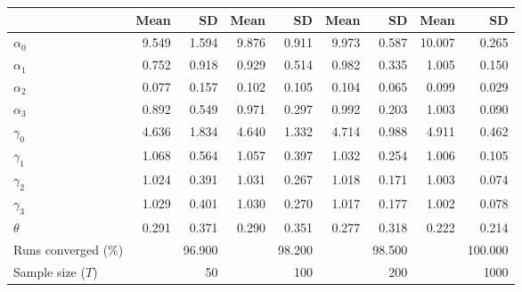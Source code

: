
\begin{tabular}[t]{lrrrrrrrr}
\toprule
  & Mean & SD & Mean  & SD  & Mean   & SD   & Mean    & SD   \\
\midrule
$\alpha_{0}$ & 9.549 & 1.594 & 9.876 & 0.911 & 9.973 & 0.587 & 10.007 & 0.265\\
$\alpha_{1}$ & 0.752 & 0.918 & 0.929 & 0.514 & 0.982 & 0.335 & 1.005 & 0.150\\
$\alpha_{2}$ & 0.077 & 0.157 & 0.102 & 0.105 & 0.104 & 0.065 & 0.099 & 0.029\\
$\alpha_{3}$ & 0.892 & 0.549 & 0.971 & 0.297 & 0.992 & 0.203 & 1.003 & 0.090\\
$\gamma_{0}$ & 4.636 & 1.834 & 4.640 & 1.332 & 4.714 & 0.988 & 4.911 & 0.462\\
$\gamma_{1}$ & 1.068 & 0.564 & 1.057 & 0.397 & 1.032 & 0.254 & 1.006 & 0.105\\
$\gamma_{2}$ & 1.024 & 0.391 & 1.031 & 0.267 & 1.018 & 0.171 & 1.003 & 0.074\\
$\gamma_{3}$ & 1.029 & 0.401 & 1.030 & 0.270 & 1.017 & 0.177 & 1.002 & 0.078\\
$\theta$ & 0.291 & 0.371 & 0.290 & 0.351 & 0.277 & 0.318 & 0.222 & 0.214\\
Runs converged (\%) &  & 96.900 &  & 98.200 &  & 98.500 &  & 100.000\\
Sample size ($T$) &  & 50 &  & 100 &  & 200 &  & 1000\\
\bottomrule
\end{tabular}
